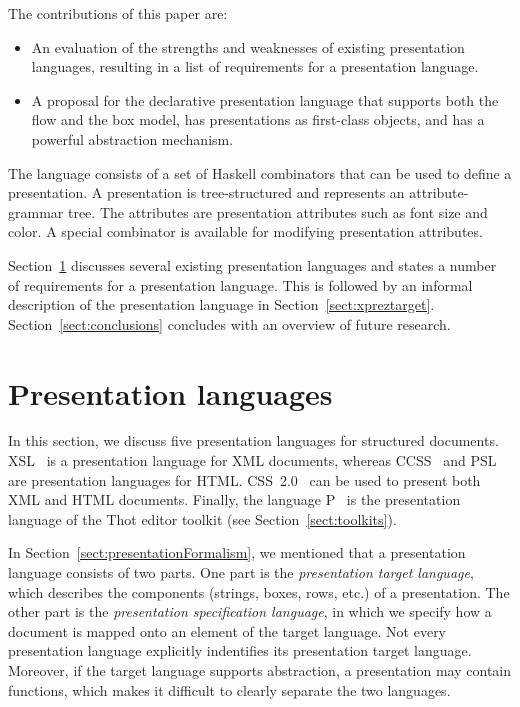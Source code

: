 \begin{center}
 \qquad
{}
\end{center}


\bc
The contributions of this paper are:

\begin{itemize}
\item An evaluation of the strengths and weaknesses of existing presentation languages, resulting in a list of requirements for a presentation language.
\item A proposal for the declarative presentation language {\Xprez} that supports both the flow and the box model, has presentations as first-class objects, and has a powerful abstraction mechanism.
\end{itemize}
\ec

The {\Xprez} language consists of a set of Haskell combinators that can be used to define a presentation. A presentation is tree-structured and represents an attribute-grammar tree. The attributes are presentation attributes such as font size and color. A special combinator is available for modifying presentation attributes. 

Section~\ref{sect:targetlangs} discusses several existing presentation languages and states a number of requirements for a presentation language. This is followed by an informal description of the {\Xprez} presentation language in Section~\ref{sect:xpreztarget}. Section~\ref{sect:conclusions} concludes with an overview of future research.


%																
%																
%																
\section{Presentation languages} \label{sect:targetlangs}

In this section, we discuss five presentation languages for structured documents. XSL~\cite{xsl10} is a presentation language for XML documents, whereas CCSS~\cite{badros99ccss} and PSL~\cite{marden98psl} are presentation languages for HTML. CSS~2.0~\cite{css2} can be used to present both XML and HTML documents. Finally, the language P~\cite{quint97thot} is the presentation language of the Thot editor toolkit (see Section~\ref{sect:toolkits}). 

In Section~\ref{sect:presentationFormalism}, we mentioned that a presentation language consists of two parts. One part is the {\em presentation target language}, which describes the components (strings, boxes, rows, etc.) of a presentation. The other part is the {\em presentation specification language}, in which we specify how a document is mapped onto an element of the target language. Not every presentation language explicitly indentifies its presentation target language. Moreover, if the target language supports abstraction, a presentation may contain functions, which makes it difficult to clearly separate the two languages.

